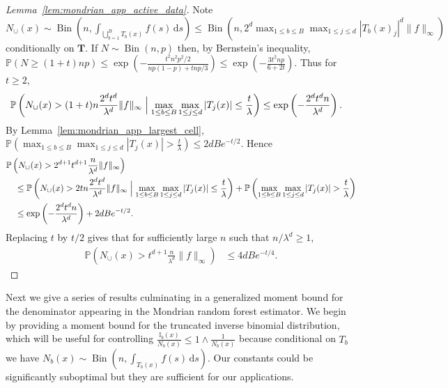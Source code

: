 \documentclass[11pt,lof]{puthesis}
\renewcommand{\P}{\ensuremath{\mathbb{P}}}
\newcommand{\I}{\ensuremath{\mathbb{I}}}
\newcommand{\bT}{\ensuremath{\mathbf{T}}}
\DeclareMathOperator{\Bin}{Bin}
\newcommand{\diff}[1]{\,\mathrm{d}#1}
\theoremstyle{break}
\theoremstyle{proof}
\newtheorem{proof}{Proof}
\begin{document}
\begin{proof}[Lemma~\ref{lem:mondrian_app_active_data}]

Note
$N_\cup(x) \sim
\Bin\left(n, \int_{\bigcup_{b=1}^{B} T_b(x)} f(s) \diff s \right)
\leq \Bin\left(n, 2^d \max_{1 \leq b \leq B} \max_{1 \leq j \leq d}
|T_b(x)_j|^d \|f\|_\infty \right)$
conditionally on $\bT$.
If $N \sim \Bin(n,p)$ then, by Bernstein's inequality,
$\P\left( N \geq (1 + t) n p\right)
\leq \exp\left(-\frac{t^2 n^2 p^2 / 2}{n p(1-p) + t n p / 3}\right)
\leq \exp\left(-\frac{3t^2 n p}{6 + 2t}\right)$.
Thus for $t \geq 2$,
%
\begin{align*}
\P \left( N_{\cup}(x) > (1+t) n \frac{2^d t^d}{\lambda^d}
\|f\|_\infty
\Bigm| \max_{1 \leq b \leq B} \max_{1 \leq j \leq d}
|T_j(x)| \leq \frac{t}{\lambda}
\right)
&\leq
\exp\left(- \frac{2^d t^{d} n}{\lambda^d}\right).
\end{align*}
%
By Lemma~\ref{lem:mondrian_app_largest_cell},
$\P \left( \max_{1 \leq b \leq B} \max_{1 \leq j \leq d}
|T_j(x)| > \frac{t}{\lambda} \right)
\leq 2 d B e^{-t/2}$.
Hence
%
\begin{align*}
&\P \left( N_{\cup}(x) > 2^{d+1} t^{d+1} \frac{n}{\lambda^d}
\|f\|_\infty
\right) \\
&\quad\leq
\P \left( N_{\cup}(x) > 2 t n \frac{2^d t^d}{\lambda^d}
\|f\|_\infty
\Bigm| \max_{1 \leq b \leq B} \max_{1 \leq j \leq d}
|T_j(x)| \leq \frac{t}{\lambda}
\right)
+ \P \left( \max_{1 \leq b \leq B} \max_{1 \leq j \leq d}
|T_j(x)| > \frac{t}{\lambda}
\right) \\
&\quad\leq
\exp\left(- \frac{2^d t^{d} n}{\lambda^d}\right)
+ 2 d B e^{-t/2}.
\end{align*}
%
Replacing $t$ by $t/2$ gives that for sufficiently large $n$ such that
$n / \lambda^d \geq 1$,
%
\begin{align*}
\P \left( N_{\cup}(x) > t^{d+1}
\frac{n}{\lambda^d}
\|f\|_\infty
\right)
&\leq
4 d B e^{-t/4}.
\end{align*}
%
\end{proof}

Next we give a series of results culminating in a
generalized moment bound for the denominator appearing
in the Mondrian random forest estimator.
We begin by providing a moment bound for the truncated inverse binomial
distribution, which will be useful for controlling
$\frac{\I_b(x)}{N_b(x)} \leq 1 \wedge \frac{1}{N_b(x)}$
because conditional on $T_b$ we have
$N_b(x) \sim \Bin \left( n, \int_{T_b(x)} f(s) \diff s \right)$.
Our constants could be significantly suboptimal but they are sufficient
for our applications.
\end{document}
